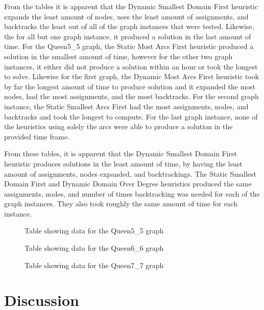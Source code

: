 \documentclass{article}
\begin{document}
From the tables it is apparent that the Dynamic Smallest Domain First heuristic
expands the least amount of nodes, uses the least amount of assignments, and
backtracks the least out of all of the graph instances that were tested.
Likewise, the for all but one graph instance, it produced a solution in the
last amount of time. For the Queen5\_5 graph, the Static Most Arcs First
heuristic produced a solution in the smallest amount of time, however for the
other two graph instances, it either did not produce a solution within an hour
or took the longest to solve. Likewise for the first graph, the Dynamic Most
Arcs First heuristic took by far the longest amount of time to produce solution
and it expanded the most nodes, had the most assignments, and the most
backtracks. For the second graph instance, the Static Smallest Arcs First had
the most assignments, nodes, and backtracks and took the longest to compute.
For the last graph instance, none of the heuristics using solely the arcs were
able to produce a solution in the provided time frame.

From these tables, it is apparent that the Dynamic Smallest Domain First
heuristic produces solutions in the least amount of time, by having the least
amount of assignments, nodes expanded, and backtrackings. The Static Smallest
Domain First and Dynamic Domain Over Degree heuristics produced the same
assignments, nodes, and number of times backtracking was needed for each of the
graph instances. They also took roughly the same amount of time for each
instance.

\begin{figure}[ht]
    \centering
    \caption{Table showing data for the Queen5\_5 graph}
    \label{fig:5}
\end{figure}

\begin{figure}[h!]
    \centering
    \caption{Table showing data for the Queen6\_6 graph}
    \label{fig:6}
\end{figure}

\begin{figure}[h!]
    \centering
    \caption{Table showing data for the Queen7\_7 graph}
    \label{fig:7}
\end{figure}

\section{Discussion}
\end{document}
